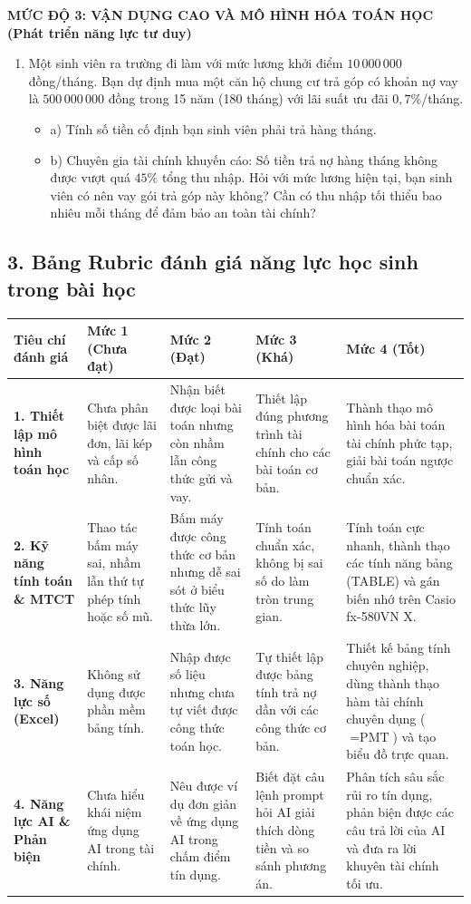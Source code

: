 \documentclass[12pt, a4paper]{article}
\begin{document}
\noindent \textbf{MỨC ĐỘ 3: VẬN DỤNG CAO VÀ MÔ HÌNH HÓA TOÁN HỌC (Phát triển năng lực tư duy)}
\begin{enumerate}
    \item Một sinh viên ra trường đi làm với mức lương khởi điểm $10\,000\,000$ đồng/tháng. Bạn dự định mua một căn hộ chung cư trả góp có khoản nợ vay là $500\,000\,000$ đồng trong 15 năm (180 tháng) với lãi suất ưu đãi $0{,}7\%$/tháng.
    \begin{itemize}
        \item a) Tính số tiền cố định bạn sinh viên phải trả hàng tháng.
        \item b) Chuyên gia tài chính khuyến cáo: Số tiền trả nợ hàng tháng không được vượt quá $45\%$ tổng thu nhập. Hỏi với mức lương hiện tại, bạn sinh viên có nên vay gói trả góp này không? Cần có thu nhập tối thiểu bao nhiêu mỗi tháng để đảm bảo an toàn tài chính?
    \end{itemize}
\end{enumerate}

\subsection*{3. Bảng Rubric đánh giá năng lực học sinh trong bài học}

\begin{center}
\renewcommand{\arraystretch}{1.25}
\begin{tabularx}{\textwidth}{|p{2.8cm}|X|X|X|X|}
    \hline
    \textbf{Tiêu chí đánh giá} & \textbf{Mức 1 (Chưa đạt)} & \textbf{Mức 2 (Đạt)} & \textbf{Mức 3 (Khá)} & \textbf{Mức 4 (Tốt)} \\
    \hline
    \textbf{1. Thiết lập mô hình toán học} & Chưa phân biệt được lãi đơn, lãi kép và cấp số nhân. & Nhận biết được loại bài toán nhưng còn nhầm lẫn công thức gửi và vay. & Thiết lập đúng phương trình tài chính cho các bài toán cơ bản. & Thành thạo mô hình hóa bài toán tài chính phức tạp, giải bài toán ngược chuẩn xác. \\
    \hline
    \textbf{2. Kỹ năng tính toán \& MTCT} & Thao tác bấm máy sai, nhầm lẫn thứ tự phép tính hoặc số mũ. & Bấm máy được công thức cơ bản nhưng dễ sai sót ở biểu thức lũy thừa lớn. & Tính toán chuẩn xác, không bị sai số do làm tròn trung gian. & Tính toán cực nhanh, thành thạo các tính năng bảng (TABLE) và gán biến nhớ trên Casio fx-580VN X. \\
    \hline
    \textbf{3. Năng lực số (Excel)} & Không sử dụng được phần mềm bảng tính. & Nhập được số liệu nhưng chưa tự viết được công thức toán học. & Tự thiết lập được bảng tính trả nợ dần với các công thức cơ bản. & Thiết kế bảng tính chuyên nghiệp, dùng thành thạo hàm tài chính chuyên dụng ($=\text{PMT}$) và tạo biểu đồ trực quan. \\
    \hline
    \textbf{4. Năng lực AI \& Phản biện} & Chưa hiểu khái niệm ứng dụng AI trong tài chính. & Nêu được ví dụ đơn giản về ứng dụng AI trong chấm điểm tín dụng. & Biết đặt câu lệnh prompt hỏi AI giải thích dòng tiền và so sánh phương án. & Phân tích sâu sắc rủi ro tín dụng, phản biện được các câu trả lời của AI và đưa ra lời khuyên tài chính tối ưu. \\
    \hline
\end{tabularx}
\end{center}
\end{document}
